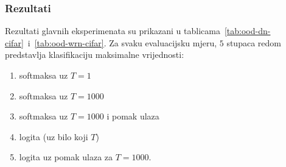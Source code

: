 \documentclass[utf8, diplomski, lmodern]{fer}
\begin{document}
\subsubsection{Rezultati}

Rezultati glavnih eksperimenata su prikazani u tablicama~\ref{tab:ood-dn-cifar}~i~\ref{tab:ood-wrn-cifar}. Za svaku evaluacijsku mjeru, $5$ stupaca redom predstavlja klasifikaciju maksimalne vrijednosti:
\begin{enumerate}[topsep=0pt,itemsep=0pt,partopsep=0pt]
\item softmaksa uz $T=1$
\item softmaksa uz $T=1000$ %
\item softmaksa uz $T=1000$ i pomak ulaza
\item logita (uz bilo koji $T$)
\item logita uz pomak ulaza za $T=1000$.
\end{enumerate}
\end{document}

